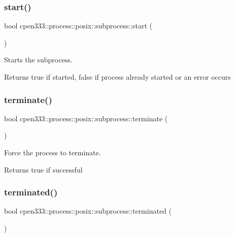 \subsubsection{\texorpdfstring{start()}{start()}}
{\footnotesize\ttfamily bool cpen333\+::process\+::posix\+::subprocess\+::start (\begin{DoxyParamCaption}{ }\end{DoxyParamCaption})\hspace{0.3cm}{\ttfamily [inline]}}



Starts the subprocess. 

\begin{DoxyReturn}{Returns}
true if started, false if process already started or an error occurs 
\end{DoxyReturn}
\mbox{\label{classcpen333_1_1process_1_1posix_1_1subprocess_aee0a935ed7052a7622872345bd148ca1}} 
\subsubsection{\texorpdfstring{terminate()}{terminate()}}
{\footnotesize\ttfamily bool cpen333\+::process\+::posix\+::subprocess\+::terminate (\begin{DoxyParamCaption}{ }\end{DoxyParamCaption})\hspace{0.3cm}{\ttfamily [inline]}}



Force the process to terminate. 

\begin{DoxyReturn}{Returns}
true if successful 
\end{DoxyReturn}
\mbox{\label{classcpen333_1_1process_1_1posix_1_1subprocess_aabc5ed98ead25bc40663e586a83e62bb}} 
\subsubsection{\texorpdfstring{terminated()}{terminated()}}
{\footnotesize\ttfamily bool cpen333\+::process\+::posix\+::subprocess\+::terminated (\begin{DoxyParamCaption}{ }\end{DoxyParamCaption})\hspace{0.3cm}{\ttfamily [inline]}}



